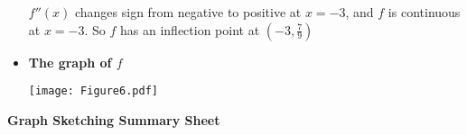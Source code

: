 \documentclass[nooutcomes]{ximera}
\newcommand{\dfn}{\textbf}
\renewenvironment{freeResponse}{
\ifhandout\setbox0\vbox\bgroup\else
\begin{trivlist}\item[\hskip \labelsep\bfseries Solution:\hspace{2ex}]
\fi}
{\ifhandout\egroup\else
\end{trivlist}
\fi}
\begin{document}
\begin{problem}
\begin{freeResponse}
\begin{itemize}
			$f''(x)$ changes sign from negative to positive at $x=-3$, and $f$ is continuous at $x=-3$.  So $f$ has an inflection point at $\left( -3, \frac{7}{9} \right)$
			
\newpage

			\item  \dfn{The graph of $f$}
			
			\begin{image}
			\texttt{[image: Figure6.pdf]}
			\end{image}
			
		\end{itemize}
		
		\end{freeResponse}
		
		
		

\end{problem}









\newpage









\begin{center}  \dfn{Graph Sketching Summary Sheet}  \end{center}
\end{document}
